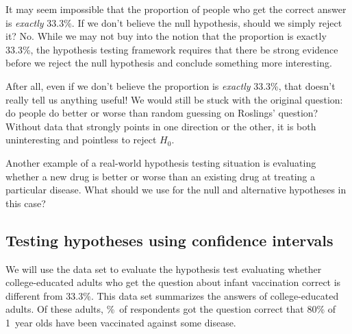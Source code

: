 \begin{examplewrap}
\begin{nexample}{It may seem impossible that the
    proportion of people who get the correct answer
    is \emph{exactly} 33.3\%. If we don't believe the
    null hypothesis, should we simply reject it?}
  No. While we may not buy into the notion that
  the proportion is exactly 33.3\%, the hypothesis testing
  framework requires that there be strong evidence before
  we reject the null hypothesis and conclude something
  more interesting.

  After all, even if we don't believe the proportion is
  \emph{exactly} 33.3\%, that doesn't really tell us anything
  useful! We would still be stuck with the original question:
  do people do better or worse than random guessing on
  Roslings' question?
  Without data that strongly
  points in one direction or the other, it is both
  uninteresting and pointless to reject $H_0$.
\end{nexample}
\end{examplewrap}

\begin{exercisewrap}
\begin{nexercise}
  Another example of a real-world hypothesis testing situation
  is evaluating whether a new drug is better or worse
  than an existing drug at treating a particular disease.
  What should we use for the null and alternative hypotheses in
  this case?\footnotemark{}
\end{nexercise}
\end{exercisewrap}


\D{\newpage}

\subsection{Testing hypotheses using confidence intervals}
\label{utilizingOurCI}

We will use the 
data set to evaluate
the hypothesis test evaluating whether college-educated adults
who get the question about infant vaccination correct is different
from 33.3\%.
This data set summarizes the answers of \roslingAsize{}
college-educated adults.
Of these \roslingAsize{} adults, \roslingApercent{}\%~of
respondents got the question correct that 80\% of 1~year olds
have been vaccinated against some disease.

